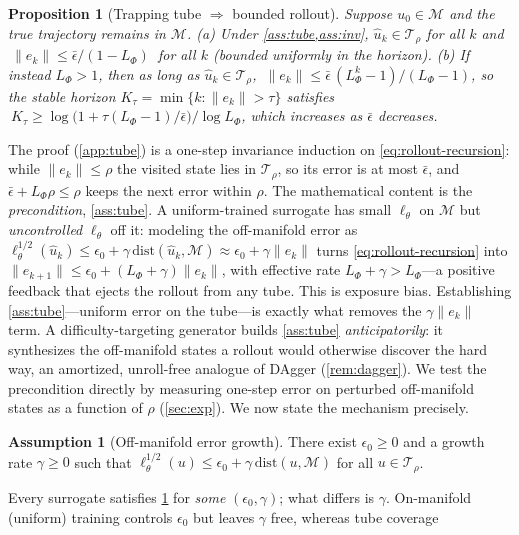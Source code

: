 \documentclass{article}
\theoremstyle{plain}
\newtheorem{proposition}{Proposition}
\theoremstyle{definition}
\newtheorem{assumption}{Assumption}
\theoremstyle{remark}
\newcommand{\state}{u}
\newcommand{\manifold}{\mathcal{M}}
\newcommand{\sol}{\Phi}
\newcommand{\lossf}{\ell_\theta}
\newcommand{\tube}{\mathcal{T}_{\rho}}
\newcommand{\dist}{\mathrm{dist}}
\begin{document}
\begin{proposition}[Trapping tube $\Rightarrow$ bounded rollout]\label{prop:tube}
Suppose $\state_0\in\manifold$ and the true trajectory remains in $\manifold$.
\emph{(a)} Under \cref{ass:tube,ass:inv}, $\hat\state_k\in\tube$ for all $k$ and
$\ \|e_k\|\le \bar\epsilon/(1-L_{\sol})\ $ for all $k$ (bounded uniformly in the horizon).
\emph{(b)} If instead $L_{\sol}>1$, then as long as $\hat\state_k\in\tube$,
$\ \|e_k\|\le \bar\epsilon\,(L_{\sol}^k-1)/(L_{\sol}-1)$, so the stable horizon
$K_\tau=\min\{k:\|e_k\|>\tau\}$ satisfies
$\ K_\tau\ge \log\!\bigl(1+\tau(L_{\sol}-1)/\bar\epsilon\bigr)/\log L_{\sol}$,
which increases as $\bar\epsilon$ decreases.
\end{proposition}
The proof (\cref{app:tube}) is a one-step invariance induction on \eqref{eq:rollout-recursion}: while
$\|e_k\|\le\rho$ the visited state lies in $\tube$, so its error is at most $\bar\epsilon$, and
$\bar\epsilon+L_{\sol}\rho\le\rho$ keeps the next error within $\rho$. The mathematical content is the
\emph{precondition}, \cref{ass:tube}. A uniform-trained surrogate has small $\lossf$ on $\manifold$ but
\emph{uncontrolled} $\lossf$ off it: modeling the off-manifold error as
$\lossf^{1/2}(\hat\state_k)\le\epsilon_0+\gamma\,\dist(\hat\state_k,\manifold)\approx\epsilon_0+\gamma\|e_k\|$
turns \eqref{eq:rollout-recursion} into $\|e_{k+1}\|\le\epsilon_0+(L_{\sol}+\gamma)\|e_k\|$, with
effective rate $L_{\sol}+\gamma>L_{\sol}$---a positive feedback that ejects the rollout from any tube.
This is exposure bias. Establishing \cref{ass:tube}---uniform error on the tube---is exactly what removes
the $\gamma\|e_k\|$ term. A difficulty-targeting generator builds \cref{ass:tube} \emph{anticipatorily}:
it synthesizes the off-manifold states a rollout would otherwise discover the hard way, an amortized,
unroll-free analogue of DAgger \citep{ross2011dagger} (\cref{rem:dagger}). We test the precondition
directly by measuring one-step error on perturbed off-manifold states as a function of $\rho$
(\cref{sec:exp}). We now state the mechanism precisely.
\begin{assumption}[Off-manifold error growth]\label{ass:offman}
There exist $\epsilon_0\ge0$ and a growth rate $\gamma\ge0$ such that
$\lossf^{1/2}(\state)\le\epsilon_0+\gamma\,\dist(\state,\manifold)$ for all $\state\in\tube$.
\end{assumption}
Every surrogate satisfies \cref{ass:offman} for \emph{some} $(\epsilon_0,\gamma)$; what differs is $\gamma$.
On-manifold (uniform) training controls $\epsilon_0$ but leaves $\gamma$ free, whereas tube coverage
\end{document}
